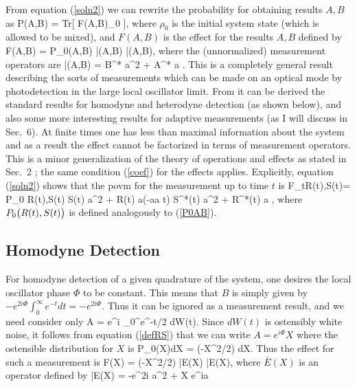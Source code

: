 From equation (\ref{soln2})  we
can rewrite the probability for obtaining results $A,B$ as
\beq
P(A,B) = {\rm Tr}[ F(A,B)\rho_0 ],
\eeq
where $\rho_0$ is the initial system state (which is allowed to be mixed), and
$F(A,B)$ is the effect for the results $A,B$ defined by
\beq \label{horesult}
F(A,B) = P_0(A,B) \bar\Omega\dg(A,B) \bar\Omega(A,B),
\eeq
where the (unnormalized) measurement operators are
\beq \label{genres}
\bar\Omega(A,B) =  \exp \bl \half B^* a^2  + A^* a \br.
\eeq
This is a completely general result
describing the sorts of measurements which can be made on an optical mode by
photodetection in the large local oscillator limit. From it can be derived the
standard results for homodyne and heterodyne detection (as shown below),
and also some more interesting results for adaptive measurements (as I will discuss
in Sec.~6). At finite times one has less than maximal information about the
system and as a result the effect cannot be factorized in terms of measurement
operators. This is a minor generalization of the theory of operations and effects as
stated in Sec.~2 \cite{Gar91}; the same condition (\ref{coef}) for the effects applies. Explicitly,
equation (\ref{soln2}) shows that the {\sc povm} for the measurement up to time $t$ is 
\beq \label{foradapt}
F_t\bl R(t),S(t)\br = P_0 \bl R(t),S(t) \br  \exp \bl \half S(t) {a\dg}^2  + R(t)
a\dg \br \exp(-a\dg a t) \exp \bl \half S^*(t) a^2  + R^*(t) a \br,
\eeq
where $P_0{\bigl(} R(t),S(t) {\bigr)}$ is defined analogously to (\ref{P0AB}).

\subsection{Homodyne Detection}

For homodyne detection of a given quadrature of the system, one desires the local
oscillator phase $\Phi$ to be constant. This means that $B$ is simply given by
$-e^{2i\Phi} \int_0^\infty e^{-t} dt = -e^{2i\Phi}$.
Thus it can be ignored as a measurement result, and we need consider only
\beq
A = e^{i\Phi} \int_0^\infty e^{-t/2} dW(t).
\eeq
Since $dW(t)$ is ostensibly white noise, it follows from equation (\ref{defRS}) that we
can write $A=e^{i\Phi}X$ where the ostensible distribution for $X$ is 
\beq
P_0(X)dX =  \exp(-X^2/2) dX.
\eeq
Thus the effect for such a measurement is
\beq \label{effhom}
F(X) =  \exp(-X^2/2)  \bar{E}(X) 
\bar{E}\dg(X),
\eeq
where $\bar{E}(X)$ is an operator defined by
\beq
\bar{E}(X) = 
\exp\bl -\half e^{2i\Phi} a\dg{}^2 + X e^{i\Phi}a\dg \br 
\eeq

